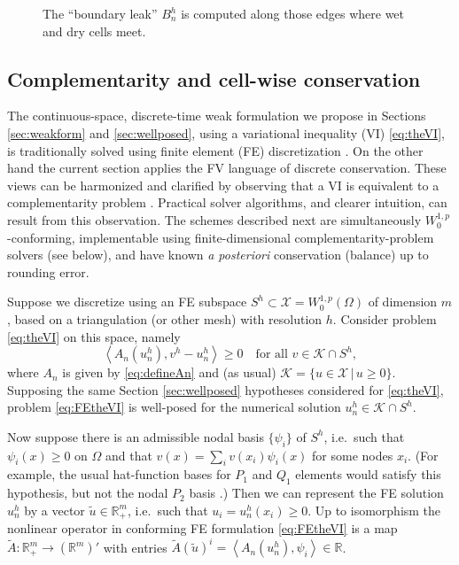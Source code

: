 \documentclass[final,onefignum]{siamart190516}
\newcommand{\ip}[2]{\ensuremath{\left<#1,#2\right>}}
\newcommand\RR{\mathbb{R}}
\begin{document}
\begin{figure}[ht]
\begin{center}

\end{center}
\caption{The ``boundary leak'' $B_n^h$ is computed along those edges where wet and dry cells meet.}
\label{fig:fvmesh-leak}
\end{figure}


\subsection{Complementarity and cell-wise conservation}  \label{subsec:ncp}

The continuous-space, discrete-time weak formulation we propose in Sections \ref{sec:weakform} and \ref{sec:wellposed}, using a variational inequality (VI) \eqref{eq:theVI}, is traditionally solved using finite element (FE) discretization \cite[for example]{CalvoDuranyVazquez2000,JouvetBueler2012,
JouvetBuelerGraeserKornhuber2013}.  On the other hand the current section applies the FV language of discrete conservation.  These views can be harmonized and clarified by observing that a VI is equivalent to a complementarity problem \cite{FacchineiPang2003,KinderlehrerStampacchia1980}.  Practical solver algorithms, and clearer intuition, can result from this observation.  The schemes described next are simultaneously $W_0^{1,p}$-conforming, implementable using finite-dimensional complementarity-problem solvers (see below), and have known \emph{a posteriori} conservation (balance) up to rounding error.

Suppose we discretize using an FE subspace $S^h \subset \mathcal{X} = W_0^{1,p}(\Omega)$ of dimension $m$, based on a triangulation (or other mesh) with resolution $h$.  Consider problem \eqref{eq:theVI} on this space, namely
\begin{equation}
\ip{A_n(u_n^h)}{v^h-u_n^h} \ge 0 \quad \text{for all } v \in \mathcal{K} \cap S^h,   \label{eq:FEtheVI}
\end{equation}
where $A_n$ is given by \eqref{eq:defineAn} and (as usual) $\mathcal{K} = \{u\in \mathcal{X}\,\big|\,u\ge 0\}$.  Supposing the same Section \ref{sec:wellposed} hypotheses considered for \eqref{eq:theVI}, problem \eqref{eq:FEtheVI} is well-posed for the numerical solution $u_n^h \in \mathcal{K} \cap S^h$.

Now suppose there is an admissible nodal basis $\{\psi_i\}$ of $S^h$, i.e.~such that $\psi_i(x)\ge 0$ on $\Omega$ and that $v(x) = \sum_i v(x_i) \psi_i(x)$ for some nodes $x_i$.  (For example, the usual hat-function bases for $P_1$ and $Q_1$ elements would satisfy this hypothesis, but not the nodal $P_2$ basis \cite{Elmanetal2014}.)  Then we can represent the FE solution $u_n^h$ by a vector $\tilde u \in \RR_+^m$, i.e.~such that $u_i = u_n^h(x_i) \ge 0$.  Up to isomorphism the nonlinear operator in conforming FE formulation \eqref{eq:FEtheVI} is a map $\tilde A:\RR_+^m \to (\RR^m)'$ with entries $\tilde A(\tilde u)^i = \ip{A_n(u_n^h)}{\psi_i} \in \RR$.
\end{document}
